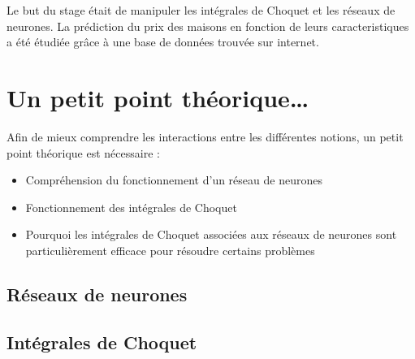 
Le but du stage était de manipuler les intégrales de Choquet et les réseaux de neurones.
La prédiction du prix des maisons en fonction de leurs caracteristiques a été étudiée
grâce à une base de données trouvée sur internet\cite{houses}.


\section{Un petit point théorique\ldots}
\label{sec:th}
Afin de mieux comprendre les interactions entre les différentes notions,
un petit point théorique est nécessaire :
\begin{itemize}
    \item Compréhension du fonctionnement d'un réseau de neurones
    \item Fonctionnement des intégrales de Choquet
    \item Pourquoi les intégrales de Choquet associées aux réseaux de neurones sont particulièrement
        efficace pour résoudre certains problèmes
\end{itemize}

\subsection{Réseaux de neurones}\label{subsec:réseau-de-neurones}


\newpage


\subsection{Intégrales de Choquet}\label{subsec:intégrales-de-Choquet}

